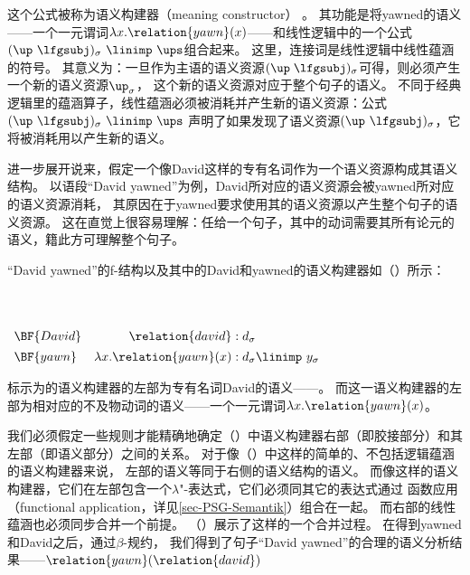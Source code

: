 \ea
{}
\z

\noindent 
这个公式被称为语义构建器（meaning constructor）
。
其功能是将yawned的语义——一个一元谓词$\lambda x. \relation{yawn}(x)$——和线性逻辑中的一个公式
\is{\linimp}
\mbox{$(\up\ \lfgsubj)_\sigma\ \linimp\ \ups$}组合起来。
这里，连接词\linimp 是线性逻辑中线性蕴涵的符号。
其意义为：一旦作为主语的语义资源$(\up\;\lfgsubj)_\sigma$可得，则必须产生一个新的语义资源$\up_\sigma$，
这个新的语义资源对应于整个句子的语义。 
不同于经典逻辑里的蕴涵算子，线性蕴涵必须被消耗并产生新的语义资源：公式\mbox{$(\up\ \lfgsubj)_\sigma\ \linimp\ \ups$}
声明了如果发现了语义资源\mbox{$(\up\  \lfgsubj)_\sigma$}，它将被消耗用以产生新的语义\ups。

进一步展开说来，假定一个像David这样的专有名词作为一个语义资源构成其语义结构。
以语段``David yawned''为例，David所对应的语义资源会被yawned所对应的语义资源消耗，
其原因在于yawned要求使用其\lfgsubj 的语义资源以产生整个句子的语义资源。
这在直觉上很容易理解：任给一个句子，其中的动词需要其所有论元的语义，籍此方可理解整个句子。
  
``David yawned''的f-结构以及其中的David和yawned的语义构建器如（）所示：

\eanoraggedright
 ~\\[-\baselineskip]
~\\[1em]
{$\begin{array}[t]{lr@{\;:\;}l}
\BF{David}&{\relation{david}}&{d_\sigma}\\*[1ex]
\BF{yawn}&{\lambda x. \relation{yawn}(x)}&{d_\sigma \linimp\ y_\sigma}
\end{array}$}
\z

\noindent 
标示为的语义构建器的左部为专有名词David的语义——。
而这一语义构建器的左部为相对应的不及物动词的语义——一个一元谓词$\lambda x. \relation{yawn}(x)$。

我们必须假定一些规则才能精确地确定（）中语义构建器右部（即胶接部分）和其左部（即语义部分）之间的关系。
对于像（）中这样的简单的、不包括逻辑蕴涵的语义构建器来说，
左部的语义等同于右侧的语义结构的语义。
而像这样的语义构建器，它们在左部包含一个$\lambda$"-表达式，它们必须同其它的表达式通过
函数应用（functional application，详见\ref{sec-PSG-Semantik}）组合在一起。
而右部的线性蕴涵也必须同步合并一个前提。
（）展示了这样的一个合并过程。
在得到yawned和David之后，通过$\beta$-规约，
我们得到了句子``David yawned''的合理的语义分析结果——$\relation{yawn}(\relation{david})$ 

